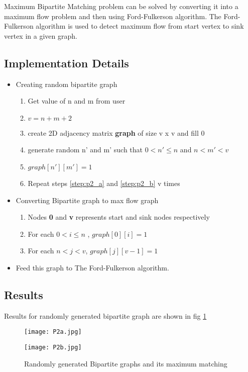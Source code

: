 \documentclass[11pt,a4paper]{article}
\begin{document}
Maximum Bipartite Matching problem can be solved by converting it into a maximum flow problem and then using  Ford-Fulkerson algorithm. The Ford-Fulkerson algorithm is used to detect maximum flow from start vertex to sink vertex in a given graph.

\subsection{Implementation Details}\label{sec:details2}
\begin{itemize}
    \item Creating random bipartite graph
    \begin{enumerate}
        \item Get value of n and m from user
        \item $v=n+m+2$
        \item create 2D adjacency matrix \textbf{graph} of size v x v and fill 0
        \item generate random n' and m' such that $0 < n' \leq n$ and $ n< m'< v $ \label{step:p2_a}
        \item \textbf{$graph[n'][m']=1$} \label{step:p2_b}
        \item Repeat steps \ref{step:p2_a} and \ref{step:p2_b} v times
    \end{enumerate}
    \item Converting Bipartite graph to max flow graph
    \begin{enumerate}
        \item Nodes \textbf{0} and \textbf{v} represents start and sink nodes respectively
        \item For each $0 < i \leq n$ , {$graph[0][i]=1$}
        \item For each $ n< j< v $, {$graph[j][v-1]=1$}
    \end{enumerate}
    \item Feed this graph to The Ford-Fulkerson algorithm.
\end{itemize}
\subsection{Results}\label{sec:results2}
Results for randomly generated bipartite graph are shown in fig \ref{fig:output_2}

\begin{figure}[ht]
\texttt{[image: P2a.jpg]}
\centering

\texttt{[image: P2b.jpg]}
\caption{Randomly generated Bipartite graphs and its maximum matching }
\label{fig:output_2}
\end{figure}
\clearpage
\end{document}
